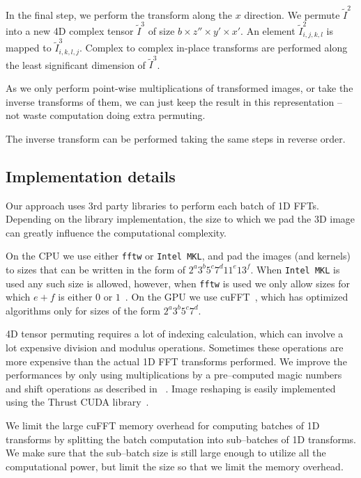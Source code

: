 \documentclass[conference]{./IEEEtran/IEEEtran}
\begin{document}
  In the final step, we perform the transform along the $x$ direction.
  We permute $\widetilde{I}^2$ into a new 4D complex tensor
  $\widetilde{I}^3$ of size $b \times z'' \times y' \times x'$.  An
  element $\widetilde{I}^2_{i,j,k,l}$ is mapped to
  $\widetilde{I}^3_{i,k,l,j}$.  Complex to complex in-place transforms
  are performed along the least significant dimension of
  $\widetilde{I}^3$.

  As we only perform point-wise multiplications of transformed images,
  or take the inverse transforms of them, we can just keep the result
  in this representation -- not waste computation doing extra
  permuting.

  The inverse transform can be performed taking the same steps in
  reverse order.

  \subsection{Implementation details}

  Our approach uses $3$rd party libraries to perform each batch of 1D
  FFTs.  Depending on the library implementation, the size to which we
  pad the 3D image can greatly influence the computational complexity.

  On the CPU we use either {\tt fftw} or {\tt Intel MKL}, and pad the
  images (and kernels) to sizes that can be written in the form of
  $2^a3^b5^c7^d11^e13^f$.  When {\tt Intel MKL} is used any such size
  is allowed, however, when {\tt fftw} is used we only allow sizes for
  which $e+f$ is either $0$ or $1$~\cite{frigo1999fftw,frigo1998fftw}.
  On the GPU we use cuFFT~\cite{nvidia2010cufft}, which has optimized
  algorithms only for sizes of the form $2^a3^b5^c7^d$.

  4D tensor permuting requires a lot of indexing calculation, which
  can involve a lot expensive division and modulus operations.
  Sometimes these operations are more expensive than the actual 1D FFT
  transforms performed.  We improve the performances by only using
  multiplications by a pre--computed magic numbers and shift
  operations as described in ~\cite{warren2013hacker}.  Image
  reshaping is easily implemented using the Thrust CUDA
  library~\cite{bell2011thrust}.

  We limit the large cuFFT memory overhead for computing batches of 1D
  transforms by splitting the batch computation into sub--batches of
  1D transforms.  We make sure that the sub--batch size is still large
  enough to utilize all the computational power, but limit the size so
  that we limit the memory overhead.
\end{document}
